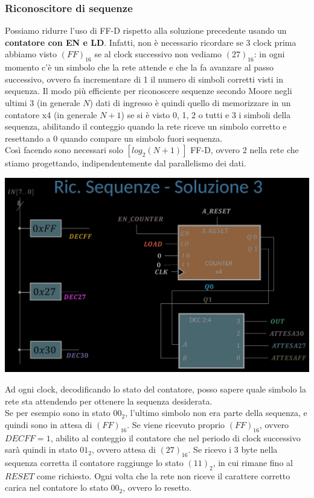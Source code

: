 \documentclass{article}
\begin{document}
\subsubsection*{Riconoscitore di sequenze}
Possiamo ridurre l'uso di FF-D rispetto alla soluzione precedente usando un \textbf{\color{cyan}contatore con EN e LD}. Infatti, non è necessario ricordare se 3 clock prima abbiamo visto $(FF)_{16}$ se al clock successivo non vediamo $(27)_{16}$: in ogni momento c’è un simbolo che la rete attende e che la fa avanzare al passo successivo, ovvero fa incrementare di 1 il numero di simboli corretti visti in sequenza. Il modo più efficiente per riconoscere sequenze secondo Moore negli ultimi 3 (in generale $N$) dati di ingresso è quindi quello di memorizzare in un contatore x4 (in generale $N+1$) se si è visto 0, 1, 2 o tutti e 3 i simboli della sequenza, abilitando il conteggio quando la rete riceve un simbolo corretto e resettando a 0 quando compare un simbolo fuori sequenza.\\
Così facendo sono necessari solo $[log_2(N+1)]$ FF-D, ovvero 2 nella rete che stiamo progettando, indipendentemente dal parallelismo dei dati.
\begin{center}
    \includegraphics[scale=0.35]{ric. sequenze 3.png}
\end{center}
Ad ogni clock, decodificando lo stato del contatore, posso sapere quale simbolo la rete sta attendendo per ottenere la sequenza desiderata.\\
Se per esempio sono in stato $00_2$, l’ultimo simbolo non era parte della sequenza, e quindi sono in attesa di $(FF)_16$. Se viene ricevuto proprio $(FF)_16$, ovvero $DECFF=1$, abilito al conteggio il contatore che nel periodo di clock successivo sarà quindi in stato $01_2$, ovvero attesa di $(27)_16$. Se ricevo i 3 byte nella sequenza corretta il contatore raggiunge lo stato $(11)_2$, in cui rimane fino al $RESET$ come richiesto. Ogni volta che la rete non riceve il carattere corretto carica nel contatore lo stato $00_2$, ovvero lo resetto.\\
\end{document}
